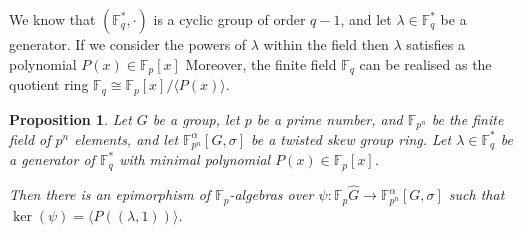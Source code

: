 \documentclass{article}
\newtheorem{proposition}[theorem]{Proposition}
\begin{document}
We know that $(\mathbb{F}_q^{*},\cdot)$ is a cyclic group of order $q-1$, and let
$\lambda \in \mathbb{F}_q^{*}$ be a generator. If we consider the powers of $\lambda$ within the
field then $\lambda$ satisfies a
polynomial $P(x)\in \mathbb{F}_p[x]$ 
Moreover, the finite field $\mathbb{F}_q$ can be realised as the quotient ring
$\mathbb{F}_q \cong \mathbb{F}_p[x]/\langle P(x)\rangle .
$
\begin{proposition}
Let $G$ be a group, let $p$ be a prime number, and $\mathbb{F}_{p^n}$ be the finite field of $p^n$ elements, and let $\mathbb{F}_{p^n}^\alpha[G,\sigma]$ be a twisted skew group ring. Let $\lambda\in \mathbb{F}_q^{*}$ be a generator of $ \mathbb{F}_q^{*}$ with minimal polynomial $P(x) \in \mathbb{F}_p[x]$. 

Then there is an epimorphism of $\mathbb{F}_p$-algebras over  $\psi:\mathbb{F}_p \hat{G} \longrightarrow \mathbb{F}_{p^n}^\alpha[G,\sigma]$ such that $\ker(\psi) = \langle P((\lambda,1)) \rangle$.
\end{proposition}
\end{document}
